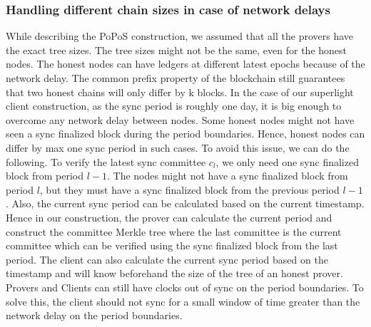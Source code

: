 \subsubsection{Handling different chain sizes in case of network delays}
While describing the PoPoS construction, we assumed that all the provers have the exact tree sizes. 
The tree sizes might not be the same, even for the honest nodes. 
The honest nodes can have ledgers at different latest epochs because of the network delay. 
The common prefix property of the blockchain still guarantees that two honest chains will only differ by k blocks. 
In the case of our superlight client construction, as the sync period is roughly one day, it is big enough to overcome any network delay between nodes. 
Some honest nodes might not have seen a sync finalized block during the period boundaries. 
Hence, honest nodes can differ by max one sync period in such cases. 
To avoid this issue, we can do the following. 
To verify the latest sync committee $c_l$, we only need one sync finalized block from period $l - 1$.
The nodes might not have a sync finalized block from period $l$, but they must have a sync finalized block from the previous period $l - 1$. 
Also, the current sync period can be calculated based on the current timestamp. 
Hence in our construction, the prover can calculate the current period and construct the committee Merkle tree where the last committee is the current committee which can be verified using the sync finalized block from the last period. 
The client can also calculate the current sync period based on the timestamp and will know beforehand the size of the tree of an honest prover. 
Provers and Clients can still have clocks out of sync on the period boundaries. 
To solve this, the client should not sync for a small window of time greater than the network delay on the period boundaries.    
   